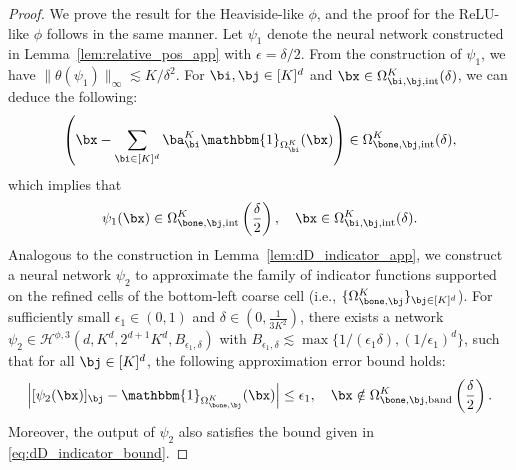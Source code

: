 \documentclass[11pt]{article}
\begin{document}
\begin{proof}
     We prove the result for the Heaviside-like $\phi$, and the proof for the ReLU-like $\phi$ follows in the same manner. Let $\psi_1$ denote the neural network constructed in Lemma~\ref{lem:relative_pos_app} with $\epsilon = \delta / 2$. From the construction of $\psi_1$, we have $\|\theta(\psi_1)\|_{\infty} \lesssim K / \delta^2$. For $\bi, \bj \in [K]^d$
     and $\bx \in \Omega_{\bi, \bj, \mathrm{int}}^{K}(\delta)$, we can deduce the following:
    \begin{equation*}
        \left(\bx - \sum_{\bi \in [K]^d} \ba_{\bi}^K \mathbbm{1}_{\Omega_{\bi}^K }(\bx) \right) \in \Omega_{\bone, \bj, \mathrm{int}}^{K}(\delta),
    \end{equation*}
    which implies that
    \begin{equation*}
        \psi_1(\bx) \in \Omega_{\bone, \bj, \mathrm{int}}^{K} \left( \frac{\delta}{2}\right), \quad \bx \in \Omega_{\bi, \bj, \mathrm{int}}^{K}(\delta) .
    \end{equation*}
    Analogous to the construction in Lemma~\ref{lem:dD_indicator_app}, we construct a neural network $\psi_2$ to approximate the family of indicator functions supported on the refined cells of the bottom-left coarse cell (i.e., $\{\Omega_{\bone, \bj}^K\}_{\bj \in [K]^d}$). For sufficiently small $\epsilon_1 \in (0,1)$ and $\delta \in (0, \frac{1}{3K^2})$, there exists a network $\psi_2 \in \mathcal{H}^{\phi,3}(d, K^d, 2^{d+1} K^d, B_{\epsilon_1, \delta})$ with $B_{\epsilon_1, \delta} \lesssim \max \{1 / (\epsilon_1 \delta), (1/\epsilon_1)^d\}$, such that for all $\bj \in [K]^d$, the following approximation error bound holds:
    \begin{equation*}
        \left| [\psi_2(\bx)]_{\bj} - \mathbbm{1}_{\Omega_{\bone, \bj}^{K}}( \bx)\right| \leq \epsilon_1, \quad \bx \notin \Omega_{\bone, \bj, \mathrm{band}}^{K}\left( \frac{\delta}{2} \right).
    \end{equation*}
    Moreover, the output of $\psi_2$ also satisfies the bound given in \eqref{eq:dD_indicator_bound}.
    

\end{proof}
\end{document}
